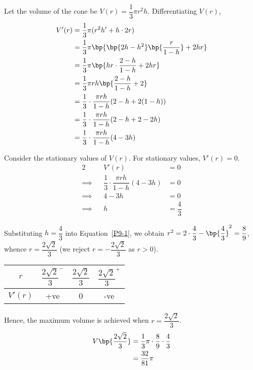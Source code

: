 \documentclass{echw}
\begin{document}
            Let the volume of the cone be $V(r) = \dfrac13 \pi r^2 h$. Differentiating $V(r)$,
            \begin{align*}
                V'(r) &= \dfrac13 \pi (r^2 h' + h \cdot 2r)\\
                &= \dfrac13 \pi \bp{\bp{2h - h^2}\bp{\dfrac{r}{1-h}} + 2hr}\\
                &= \dfrac13 \pi \bp{hr\cdot\dfrac{2 - h}{1-h} + 2hr}\\
                &= \dfrac13 \pi rh \bp{\dfrac{2 - h}{1-h} + 2}\\
                &= \dfrac13 \cdot \dfrac{\pi rh}{1-h}(2 - h + 2(1-h))\\
                &= \dfrac13 \cdot \dfrac{\pi rh}{1-h}(2 - h + 2-2h)\\
                &= \dfrac13 \cdot \dfrac{\pi rh}{1-h}(4-3h)
            \end{align*}

            Consider the stationary values of $V(r)$. For stationary values, $V'(r) = 0$.
            \begin{alignat*}{2}
                &&V'(r) &= 0\\
                \implies&& \dfrac13 \cdot \dfrac{\pi rh}{1-h}(4-3h) &= 0\\
                \implies&& 4-3h &= 0\\
                \implies&& h &= \dfrac43
            \end{alignat*}

            Substituting $h = \dfrac43$ into Equation~\ref{P9-1}, we obtain $r^2 = 2\cdot\dfrac43 - \bp{\dfrac43}^2  = \dfrac89$, whence $r = \dfrac{2\sqrt2}3$ (we reject $r = -\dfrac{2\sqrt2}3$ as $r > 0$).

            \begin{table}[h]
                \centering
                \begin{tabular}{|c|c|c|c|}
                \hline
                $r$ & $\dfrac{2\sqrt2}3^-$ & $\dfrac{2\sqrt2}3$ & $\dfrac{2\sqrt2}3^+$ \\[1ex]\hline
                $V'(r)$ & +ve   & 0 & -ve   \\\hline
                \end{tabular}
            \end{table}

            Hence, the maximum volume is achieved when $r =\dfrac{2\sqrt2}3$. 
            \begin{align*}
                V\bp{\dfrac{2\sqrt2}3} &= \dfrac13 \pi \cdot \dfrac89 \cdot \dfrac43\\
                &= \dfrac{32}{81}\pi
            \end{align*}
\end{document}
